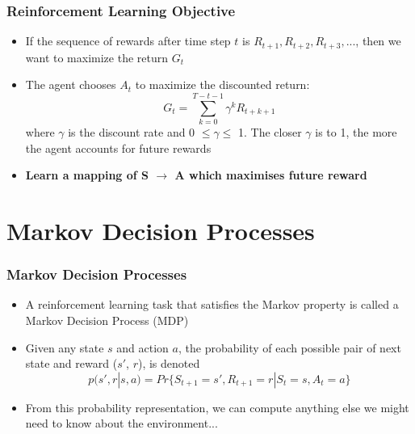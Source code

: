 \documentclass{beamer}
\begin{document}

\begin{frame}
\frametitle{Reinforcement Learning Objective}
\begin{itemize}
\item If the sequence of rewards after time step $t$ is $R_{t+1}, R_{t+2}, R_{t+3},...$, then we want to maximize the return $G_t$
\item The agent chooses $A_t$ to maximize the discounted return: 
\begin{equation}
G_t = \sum_{k=0}^{T-t-1} \gamma^k R_{t+k+1}
\nonumber
\end{equation}
where $\gamma$ is the discount rate and 0 $\leq \gamma \leq$ 1. The closer $\gamma$ is to 1, the more the agent accounts for future rewards
\item \textbf{Learn a mapping of S $\rightarrow$ A which maximises future reward}
\end{itemize}
\end{frame}

\section{Markov Decision Processes} %






\begin{frame}
\frametitle{Markov Decision Processes}
\begin{itemize}
\item A reinforcement learning task that satisfies the Markov property is called a Markov Decision Process (MDP)
\item Given any state $s$ and action $a$, the probability of each possible pair of next state and reward ($s'$, $r$), is denoted
\begin{equation}
p(s',r | s,a) = Pr\{S_{t+1} = s', R_{t+1} = r | S_t = s, A_t = a\}
\nonumber
\end{equation}
\item From this probability representation, we can compute anything else we might need to know about the environment...
\end{itemize}
\end{frame}
\end{document}

